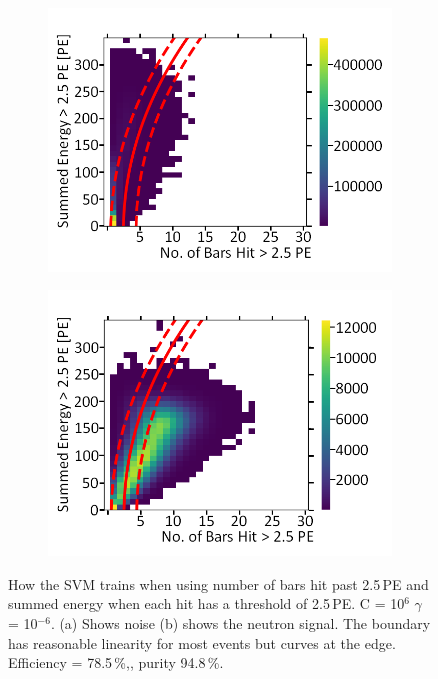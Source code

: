 \begin{figure}[!h]
\centering
\begin{subfigure}{.5\textwidth}
  \centering
  \includegraphics[width=\linewidth]{Appendix1/Figs/Bars1Sum1Noise.png}
  \captionsetup{width=.9\linewidth}
  \caption{}
  \label{subFig:Bars1Sum1N}
\end{subfigure}%
\begin{subfigure}{.5\textwidth}
  \centering
\includegraphics[width=\linewidth]{Appendix1/Figs/Bars1Sum1Signal.png}
  \captionsetup{width=.9\linewidth}
  \caption{}
  \label{subFig:Bars1Sum1S}
\end{subfigure}
\caption{How the SVM trains when using number of bars hit past 2.5\,PE and summed energy when each hit has a threshold of 2.5\,PE. C = 10$^6$ $\gamma$ = 10$^{-6}$. (a) Shows noise (b) shows the neutron signal. The boundary has reasonable linearity for most events but curves at the edge. Efficiency = 78.5\,\%,, purity 94.8\,\%.}
\label{fig:Bars1Sum1SN}
\end{figure}

